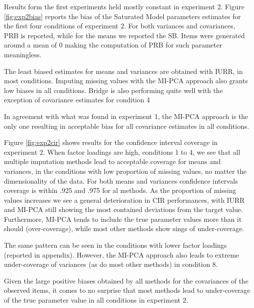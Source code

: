 	Results form the first experiments held mostly constant in experiment 2.
	Figure \ref{fig:exp2bias} reports the bias of the Saturated Model parameters estimates for the first
	four conditions of experiment 2. For both variances and covariances, PRB is reported, while for the 
	means we reported the SB. Items were generated around a mean of 0 making the computation of PRB
	for such parameter meaningless.

	The least biased estimates for means and variances are obtained with IURR, in most conditions.
	Imputing missing values with the MI-PCA approach also grants low biases in all conditions.
	Bridge is also performing quite well with the exception of covariance estimates for condition 4

	In agreement with what was found in experiment 1, the MI-PCA approach is the only one resulting 
	in acceptable bias for all covariance estimates in all conditions.

	Figure \ref{fig:exp2cir} shows results for the confidence interval coverage in experiment 2.
	When factor loadings are high, conditions 1 to 4, we see that all multiple imputation
	methods lead to acceptable coverage for means and variances, in the conditions with low proportion 
	of missing values, no matter the dimensionality of the data.
	For both means and variances confidence intervals coverage is within .925 and .975 for al methods. 
	As the proportion of missing values increases we see a general deterioration in CIR performances, with IURR
	and MI-PCA still showing the most contained deviations from the target value. 
	Furthermore, MI-PCA tends to include the true parameter values more than it should (over-coverage), 
	while most other methods show sings of under-coverage.

	The same pattern can be seen in the conditions with lower factor loadings (reported in appendix). 
	However, the MI-PCA approach also leads to extreme under-coverage of variances (as do most other methods) 
	in condition 8.

	Given the large positive biases obtained by all methods for the covariances of the observed items,
	it comes to no surprise that most methods lead to under-coverage of the true parameter value in all
	conditions in experiment 2.

